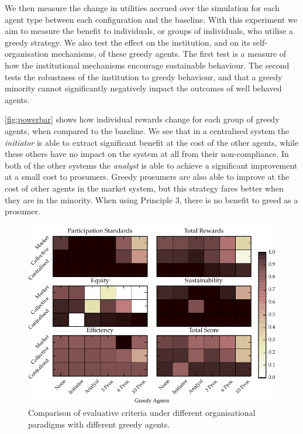 We then measure the change in utilities accrued over the simulation for each
agent type between each configuration and the baseline. With this experiment
we aim to measure the benefit to individuals, or groups of individuals, who
utilise a greedy strategy. We also test the effect on the institution, and on
its self-organisation mechanisms, of these greedy agents. The first test is a
measure of how the institutional mechanisms encourage sustainable behaviour.
The second tests the robustness of the institution to greedy behaviour, and
that a greedy minority cannot significantly negatively impact the outcomes of
well behaved agents.

\autoref{fig:powerbar} shows how individual rewards change for each group of greedy agents, when compared to the baseline.
We see that in a centralised system the \emph{initiator} is able to extract
significant benefit at the cost of the other agents, while these others have
no impact on the system at all from their non-compliance. In both of the other
systems the \emph{analyst} is able to achieve a significant improvement at a
small cost to prosumers. Greedy prosumers are also able to improve at
the cost of other agents in the market system, but this strategy fares better
when they are in the minority. When using Principle 3, there is no benefit to
greed as a prosumer.

\begin{figure}
\includegraphics{gfx/kc/powercolour.pdf} 
\caption{Comparison of evaluative criteria under different organisational paradigms with different greedy agents.}\label{fig:powercolour}
\end{figure}

